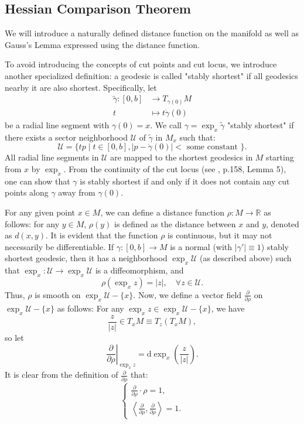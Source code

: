 \documentclass{ctexart}
\begin{document}
\subsection*{Hessian Comparison Theorem}
We will introduce a naturally defined distance function on the manifold as well as Gauss's Lemma expressed using the distance function.

To avoid introducing the concepts of cut points and cut locus, we introduce another specialized definition: a geodesic is called "stably shortest" if all geodesics nearby it are also shortest. Specifically, let
$$
\begin{aligned}
  \widetilde{\gamma}:[0, b] &\rightarrow T_{\gamma(0)} M \\
  t &\mapsto t \dot{\gamma}(0)
\end{aligned}
$$
be a radial line segment with $\gamma(0)=x$. We call $\gamma=\exp _x \widetilde{\gamma}$ "stably shortest" if there exists a sector neighborhood $\mathcal{U}$ of $\widetilde{\gamma}$ in $M_x$ such that:
$$
\mathcal{U}=\{t p\mid t \in[0, b],|p-\dot{\gamma}(0)|<\text { some constant }\}.
$$
All radial line segments in $\mathcal{U}$ are mapped to the shortest geodesics in $M$ starting from $x$ by $\exp _x$. 
From the continuity of the cut locus (see \cite{WuHongXi2014}, p.158, Lemma 5), one can show that 
$\gamma$ is stably shortest if and only if it does not contain any cut points along $\gamma$ away from $\gamma(0)$.

For any given point $x \in M$, we can define a distance function $\rho: M \rightarrow \mathbb{R}$ as follows: 
for any $y \in M$, $\rho(y)$ is defined as the distance between $x$ and $y$, denoted as $d(x, y)$. It is evident that the function $\rho$ is continuous, but it may not necessarily be differentiable.
If $\gamma:[0, b] \rightarrow M$ is a normal (with $|\gamma'|\equiv 1$) stably shortest geodesic, then it has a neighborhood $\exp _x \mathcal{U}$ (as described above) such that 
$\exp _x: \mathcal{U} \rightarrow \exp _x \mathcal{U}$ is a diffeomorphism, and
$$
\rho\left(\exp _x z\right)=|z|, \quad \forall z \in \mathcal{U} .
$$
Thus, $\rho$ is smooth on $\exp _x \mathcal{U}-\{x\}$. Now, we define a vector field $\frac{\partial}{\partial \rho}$ on $\exp _x \mathcal{U}-\{x\}$ as follows:
For any $\exp _x z \in \exp _x \mathcal{U}-\{x\}$, we have
$$
\frac{z}{|z|} \in T_x M \equiv T_z\left(T_x M\right),
$$
so let
$$
\left.\frac{\partial}{\partial \rho}\right|_{\exp _x z}=\mathrm{d} \exp _x\left(\frac{z}{|z|}\right).
$$
It is clear from the definition of $\frac{\partial}{\partial \rho}$ that:
\begin{equation}
  \left\{
  \begin{array}{l}
    \frac{\partial}{\partial \rho} \cdot \rho=1, \\
    \left\langle\frac{\partial}{\partial \rho}, \frac{\partial}{\partial \rho}\right\rangle=1 .
  \end{array}
  \right.  
\end{equation}
\end{document}
